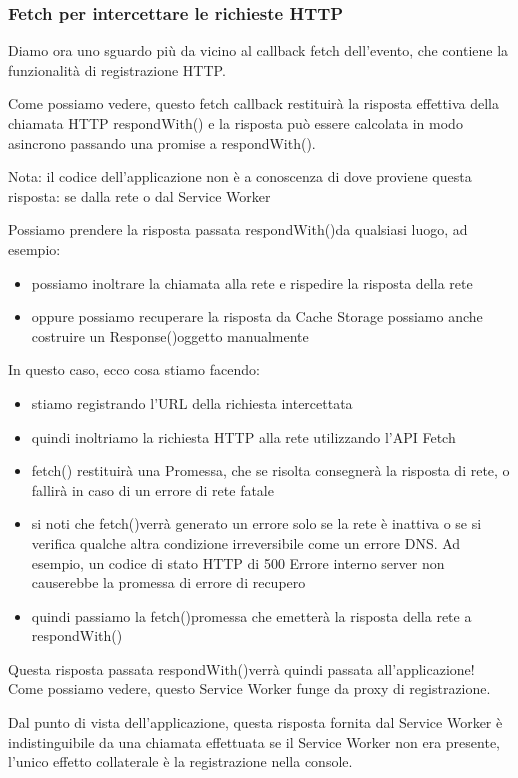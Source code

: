 \documentclass[italian]{article}
\begin{document}
\subsubsection{Fetch per intercettare le richieste HTTP}
Diamo ora uno sguardo più da vicino al callback fetch dell'evento, che contiene la funzionalità di registrazione HTTP.

Come possiamo vedere, questo fetch callback restituirà la risposta effettiva della chiamata HTTP respondWith() e la risposta può essere calcolata in modo asincrono passando una promise a respondWith().

Nota: il codice dell'applicazione non è a conoscenza di dove proviene questa risposta: se dalla rete o dal Service Worker

Possiamo prendere la risposta passata respondWith()da qualsiasi luogo, ad esempio:
\begin{itemize}
\item possiamo inoltrare la chiamata alla rete e rispedire la risposta della rete
\item oppure possiamo recuperare la risposta da Cache Storage
possiamo anche costruire un Response()oggetto manualmente
\end{itemize}

In questo caso, ecco cosa stiamo facendo:
\begin{itemize}
\item stiamo registrando l'URL della richiesta intercettata
\item quindi inoltriamo la richiesta HTTP alla rete utilizzando l'API Fetch
\item fetch() restituirà una Promessa, che se risolta consegnerà la risposta di rete, o fallirà in caso di un errore di rete fatale
\item si noti che fetch()verrà generato un errore solo se la rete è inattiva o se si verifica qualche altra condizione irreversibile come un errore DNS. Ad esempio, un codice di stato HTTP di 500 Errore interno server non causerebbe la promessa di errore di recupero
\item quindi passiamo la fetch()promessa che emetterà la risposta della rete a respondWith()
\end{itemize}
Questa risposta passata respondWith()verrà quindi passata all'applicazione! Come possiamo vedere, questo Service Worker funge da proxy di registrazione.

Dal punto di vista dell'applicazione, questa risposta fornita dal Service Worker è indistinguibile da una chiamata effettuata se il Service Worker non era presente, l'unico effetto collaterale è la registrazione nella console.
\end{document}
